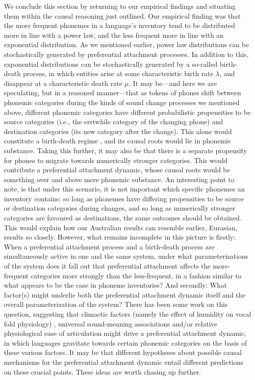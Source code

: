 We conclude this section by returning to our empirical findings and situating them within the causal reasoning just outlined. Our empirical finding was that the more frequent phonemes in a language's inventory tend to be distributed more in line with a power law, and the less frequent more in line with an exponential distribution. As we mentioned earlier, power law distributions can be stochastically generated by preferential attachment processes. In addition to this, exponential distributions can be stochastically generated by a so-called birth-death process, in which entities arise at some characteristic birth rate \(\lambda\), and disappear at a characteristic death rate \(\mu\). It may be---and here we are speculating, but in a reasoned manner---that as tokens of phones shift between phonemic categories during the kinds of sound change processes we mentioned above, different phonemic categories have different probabilistic propensities to be source categories (i.e., the erstwhile category of the changing phone) and destination categories (its new category after the change). This alone would constitute a birth-death regime \autocite{cysouw_probability_2009}, and its causal roots would lie in phonemic substance. Taking this further, it may also be that there is a separate propensity for phones to migrate towards numerically stronger categories. This would contribute a preferential attachment dynamic, whose causal roots would be something over and above mere phonemic substance. An interesting point to note, is that under this scenario, it is not important which specific phonemes an inventory contains: so long as phonemes have differing propensities to be source or destination categories during changes, and so long as numerically stronger categories are favoured as destinations, the same outcomes should be obtained. This would explain how our Australian results can resemble earlier, Eurasian, results so closely. However, what remains incomplete in this picture is firstly: When a preferential attachment process and a birth-death process are simultaneously active in one and the same system, under what parameterizations of the system does it fall out that preferential attachment affects the more-frequent categories more strongly than the less-frequent, in a fashion similar to what appears to be the case in phoneme inventories? And secondly: What factor(s) might underlie both the preferential attachment dynamic itself and the overall parameterization of the system? There has been some work on this question, suggesting that climactic factors (namely the effect of humidity on vocal fold physiology) \autocite{everett_climate_2015}, universal sound-meaning associations \autocite{blasi_soundmeaning_2016} and/or relative physiological ease of articulation \autocites{everett_similar_2018}{everett_global_2018} might drive a preferential attachment dynamic, in which languages gravitate towards certain phonemic categories on the basis of these various factors. It may be that different hypotheses about possible causal mechanisms for the preferential attachment dynamic entail different predictions on these crucial points. These ideas are worth chasing up further.

